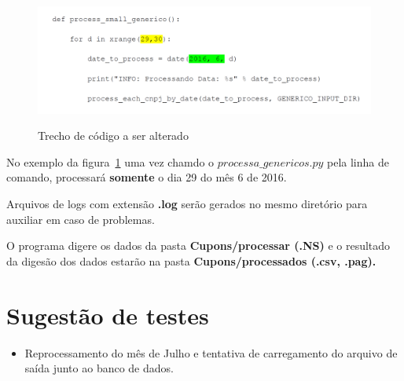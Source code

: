\documentclass{article}      %
\begin{document}
\begin{figure}[!ht]
  \centering
    \includegraphics[width=1.0\textwidth]{genericos.png}
  \label{fig:genericos}
  \caption{Trecho de código a ser alterado}
\end{figure}

No exemplo da figura~\ref{fig:genericos} uma vez chamdo o $processa\_genericos.py$ pela linha de comando, processará \textbf{somente} o dia 29 do mês 6 de 2016.

Arquivos de logs com extensão \textbf{.log} serão gerados no mesmo diretório para auxiliar em caso de problemas.

O programa digere os dados da pasta \textbf{Cupons/processar (.NS)} e o resultado da digesão dos dados estarão na pasta \textbf{Cupons/processados (.csv, .pag).}



\section{Sugestão de testes}

\begin{itemize}
    \item Reprocessamento do mês de Julho e tentativa de carregamento do arquivo de saída junto ao banco de dados.
\end{itemize}
\end{document}
